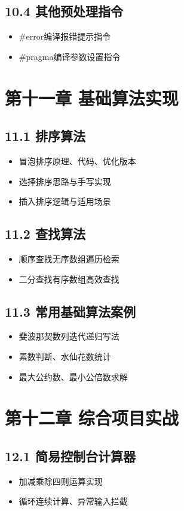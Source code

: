 \subsection*{10.4 其他预处理指令}
\begin{itemize}
\item \#error编译报错提示指令
\item \#pragma编译参数设置指令
\end{itemize}

\section*{第十一章 基础算法实现}
\subsection*{11.1 排序算法}
\begin{itemize}
\item 冒泡排序原理、代码、优化版本
\item 选择排序思路与手写实现
\item 插入排序逻辑与适用场景
\end{itemize}

\subsection*{11.2 查找算法}
\begin{itemize}
\item 顺序查找无序数组遍历检索
\item 二分查找有序数组高效查找
\end{itemize}

\subsection*{11.3 常用基础算法案例}
\begin{itemize}
\item 斐波那契数列迭代递归写法
\item 素数判断、水仙花数统计
\item 最大公约数、最小公倍数求解
\end{itemize}

\section*{第十二章 综合项目实战}
\subsection*{12.1 简易控制台计算器}
\begin{itemize}
\item 加减乘除四则运算实现
\item 循环连续计算、异常输入拦截
\end{itemize}


